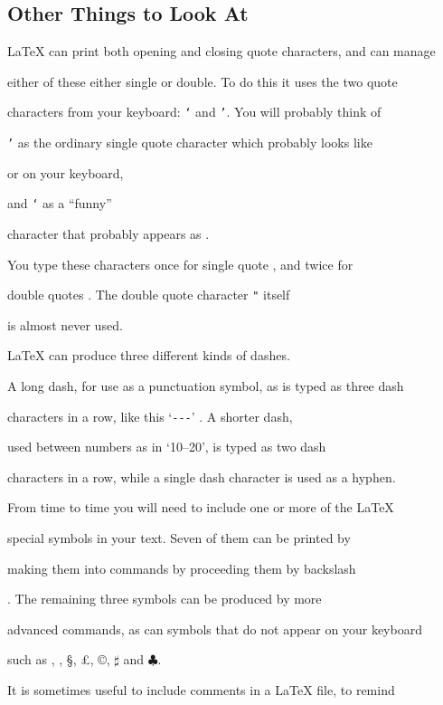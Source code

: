 \subsection{Other Things to Look At}



\LaTeX{} can print both opening and closing quote characters, and can manage

either of these either single or double.  To do this it uses the two quote

characters from your keyboard: {\tt `} and {\tt '}. You will probably think of

{\tt '} as the ordinary single quote character which probably looks like

{\tt{}} or {\tt{}} on your keyboard,

and {\tt `} as a ``funny''

character that probably appears as {\tt{}}.

You type these characters once for single quote ,  and twice for

double quotes . The double quote character {\tt "} itself

is almost never used.



\LaTeX{} can produce three different kinds of dashes.

A long dash, for use as a punctuation symbol, as is typed as three dash

characters in a row, like this `\verb|---|' .  A shorter dash,

used between numbers as in `10--20', is typed as two dash

characters in a row, while a single dash character is used as a hyphen.



From time to time you will need to include one or more of the \LaTeX{}

special symbols in your text.  Seven of them can be printed by

making them into commands by proceeding them by backslash

.  The remaining three symbols can be produced by more

advanced commands, as can symbols that do not appear on your keyboard

such as \dag, \ddag, \S, \pounds, \copyright, $\sharp$ and $\clubsuit$.



It is sometimes useful to include comments in a \LaTeX{} file, to remind

